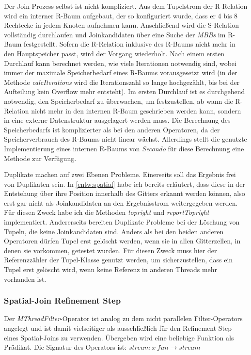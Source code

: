 \documentclass[a4paper,12pt,twoside]{article}
\newcommand{\Fb}[1]{\textit{#1}} %
\begin{document}
Der Join-Prozess selbst ist nicht kompliziert. Aus dem Tupelstrom der R-Relation wird ein interner R-Baum aufgebaut, der so konfiguriert wurde, dass er 4 bis 8 Rechtecke in jedem Knoten aufnehmen kann. Anschließend wird die S-Relation vollständig durchlaufen und Joinkandidaten über eine Suche der \Fb{MBBs} im R-Baum festgestellt. Sofern die R-Relation inklusive des R-Baums nicht mehr in den Hauptspeicher passt, wird der Vorgang wiederholt. Nach einem ersten Durchlauf kann berechnet werden, wie viele Iterationen notwendig sind, wobei immer der maximale Speicherbedarf eines R-Baums vorausgesetzt wird (in der Methode \Fb{calcIterations} wird die Iterationszahl so lange hochgezählt, bis bei der Aufteilung kein Overflow mehr entsteht). Im ersten Durchlauf ist es durchgehend notwendig, den Speicherbedarf zu überwachen, um festzustellen, ab wann die R-Relation nicht mehr in den internen R-Baum geschrieben werden kann, sondern in eine externe Datenstruktur ausgelagert werden muss. Die Berechnung des Speicherbedarfs ist komplizierter als bei den anderen Operatoren, da der Speicherverbrauch des R-Baums nicht linear wächst. Allerdings stellt die genutzte Implementierung eines internen R-Baums von \Fb{Secondo} für diese Berechnung eine Methode zur Verfügung.

Duplikate machen auf zwei Ebenen Probleme. Einerseits soll das Ergebnis frei von Duplikaten sein. In \autoref{entw:spatial} habe ich bereits erläutert, dass diese in der Entstehung über ihre Position innerhalb des Gitters erkannt werden können, also erst gar nicht als Joinkandidaten an den Ergebnisstrom weitergegeben werden. Für diesen Zweck habe ich die Methoden \Fb{topright} und \Fb{reportTopright} implementiert. Andererseits bereiten Duplikate Probleme bei der Löschung von Tupeln, die keine Joinkandidaten sind. Anders als bei den beiden anderen Operatoren dürfen Tupel erst gelöscht werden, wenn sie in allen Gitterzellen, in denen sie vorkommen, getestet wurden. Für diesen Zweck muss hier der Referenzzähler der Tupel-Klasse genutzt werden, um sicherzustellen, dass ein Tupel erst gelöscht wird, wenn keine Referenz in anderen Threads mehr vorhanden ist.

\subsubsection{Spatial-Join Refinement Step}
\label{impl:refinement}

Der \Fb{MThreadFilter}-Operator ist analog zu dem nicht parallelen Filter-Operators angelegt und ist damit vielseitiger als ausschließlich für den Refinement Step eines Spatial-Joins zu verwenden. Übergeben wird eine beliebige Funktion als Prädikat. Die Signatur des Operators ist: \newline
$stream~x~fun \longrightarrow stream$
\end{document}
